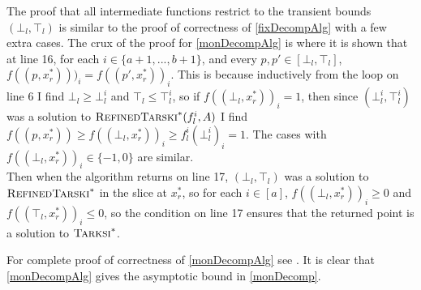 \begin{sproof}
The proof that all intermediate functions restrict to the transient bounds $(\bot_l, \top_l)$ is similar
to the proof of correctness of \cref{fixDecompAlg} with a few extra cases. 
  The crux of the proof for \cref{monDecompAlg} 
is \citep[Lemma 6]{chenLi}
where it is shown that at line 16, for each $i \in \{a + 1, ..., b + 1\}$, and every $p, p' \in [\bot_l, \top_l]$,
  $f((p, x_r^*)))_i = f((p', x_r^*))_i$. This is because inductively from the loop on line 6 I find
$\bot_l \geq \bot_l^i$ and $\top_l \leq \top_l^i$,
  so if $f((\bot_l, x_r^*))_i = 1$, then since $(\bot_l^i, \top_l^i)$ was a solution to
  $\textsc{RefinedTarski}^*(f_l^i, A)$ I find $f((p, x_r^*)) \geq f((\bot_l, x_r^*))_i \geq f_l^i(\bot_l^i)_i = 1$.
  The cases with $f((\bot_l, x_r^*))_i \in \{-1, 0 \}$ are similar. \\
  Then when the algorithm returns on line 17, $(\bot_l, \top_l)$ was a solution to
  $\textsc{RefinedTarski}^*$ in the slice at $x_r^*$, so for each $i \in [a]$, 
  $f((\bot_l, x_r^*))_i \geq 0$ and $f((\top_l, x_r^*))_i \leq 0$, so the condition on line 17
  ensures that the returned point is a solution to $\textsc{Tarksi}^*$.
\end{sproof}
For complete proof of correctness of \cref{monDecompAlg} see \citep{chenLi}. It is clear that
\cref{monDecompAlg} gives the asymptotic bound in \cref{monDecomp}.
